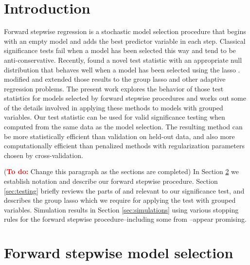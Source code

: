 \documentclass{imsart}
\newcommand{\todo}{\textcolor{red}{\textbf{To do: }}}
\begin{document}
\section{Introduction}
\label{sec:intro}

Forward stepwise regression is a stochastic model selection procedure
that begins with an empty model and adds the best predictor variable
in each step.  Classical significance tests fail when a model has been
selected this way and tend to be anti-conservative.  Recently,
\cite{significance:lasso} found a novel test statistic with an
appropriate null distribution that behaves well when a model has been
selected using the lasso \citep{tibshirani:lasso}.
\cite{tests:adaptive} modified and extended those results to the
group lasso \citep{grouplasso} and other adaptive regression
problems.  The present work explores the behavior of those test
statistics for models selected by forward stepwise procedures and
works out some of the details involved in applying these methods to
models with grouped variables.  Our test statistic can be
used for valid significance testing when computed from the same
data as the model selection.  The resulting method can
be more statistically efficient than validation on held-out data, and
also more computationally efficient than penalized methods with
regularization parameters chosen by cross-validation.



(\todo Change this paragraph as the sections are completed)
In Section \ref{sec:stepwise} we establish notation and describe our
forward stepwise procedure. Section \ref{sec:testing} briefly reviews
the parts of \cite{significance:lasso} and \cite{tests:adaptive}
relevant to our significance test, and describes the group lasso which
we require for applying the test with grouped
variables. Simulation results in Section \ref{sec:simulations} using
various stopping rules for the forward stepwise procedure--including
some from \cite{sequential:fdr}--appear promising.


\section{Forward stepwise model selection}
\label{sec:stepwise}
\end{document}
